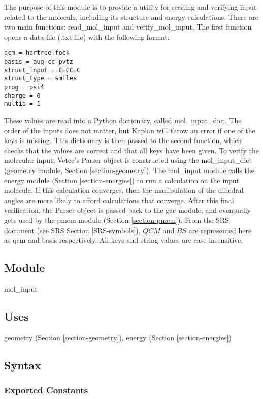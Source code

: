 \documentclass[12pt, titlepage]{article}
\newcommand{\progname}{Kaplan}
\begin{document}
The purpose of this module is to provide a utility for reading and verifying 
input related to the molecule, including its structure and energy calculations. 
There are two main functions: read\_mol\_input and verify\_mol\_input. The 
first function opens a data file (.txt file) with the following format:

\begin{lstlisting}
qcm = hartree-fock
basis = aug-cc-pvtz
struct_input = C=CC=C
struct_type = smiles
prog = psi4
charge = 0
multip = 1
\end{lstlisting}

These values are read into a Python dictionary, called mol\_input\_dict. The 
order of the inputs does not matter, but \progname{} will throw an error if one 
of the keys is missing. This dictionary is then passed to the second function, 
which checks that the values are correct and that all keys have been given. To 
verify the molecular input, Vetee's Parser object is constructed using the 
mol\_input\_dict (geometry module, Section \ref{section-geometry}). The 
mol\_input module calls the energy module (Section \ref{section-energies}) to 
run a calculation on the input molecule. If this calculation converges, then 
the manipulation of the dihedral angles are more likely to afford calculations 
that converge. After this final verification, the Parser object is passed back 
to the gac module, and eventually gets used by the pmem module 
(Section \ref{section-pmem}). From the SRS document (see SRS Section 
\ref{SRS-symbols}), $QCM$ and $BS$ are represented here as qcm and basis 
respectively. All keys and string values are case insensitive.

\subsection{Module}

mol\_input

\subsection{Uses}

geometry (Section \ref{section-geometry}), energy (Section 
\ref{section-energies})

\subsection{Syntax}

\subsubsection{Exported Constants}
\end{document}
